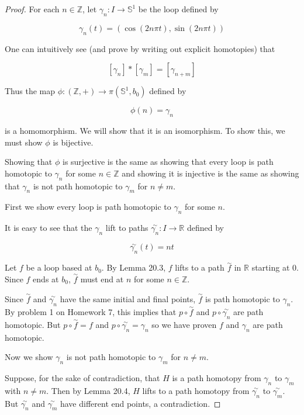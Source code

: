 \documentclass[a4paper]{article}
\numberwithin{theorem}{section}
\begin{document}
\begin{proof}
For each $n \in \mathbb{Z}$, let $\gamma_n: I \rightarrow \mathbb{S}^1$ be the loop defined by

$$ \gamma_n(t) = (\cos(2 n \pi t), \sin ( 2 n \pi t)) $$

One can intuitively see (and prove by writing out explicit homotopies) that

$$ [\gamma_n] \ast [\gamma_m] = [\gamma_{n + m}] $$

Thus the map $\phi: (\mathbb{Z},+) \rightarrow \pi(\mathbb{S}^1,b_0)$ defined by 

$$ \phi(n) = \gamma_n $$

is a homomorphism. We will show that it is an isomorphism. To show this, we must show $\phi$ is bijective.

Showing that $\phi$ is surjective is the same as showing that every loop is path homotopic to $\gamma_n$ for some $n \in \mathbb{Z}$ and showing it is injective is the same as showing that $\gamma_n$ is not path homotopic to $\gamma_m$ for $n \neq m$.

First we show every loop is path homotopic to $\gamma_n$ for some $n$.

It is easy to see that the $\gamma_n$ lift to paths $\overset{\sim}{\gamma_n}: I \rightarrow \mathbb{R}$ defined by

$$ \overset{\sim}{\gamma_n}(t) = nt $$

Let $f$ be a loop based at $b_0$. By Lemma 20.3, $f$ lifts to a path $\overset{\sim}{f}$ in $\mathbb{R}$ starting at $0$. Since $f$ ends at $b_0$, $\overset{\sim}{f}$ must end at $n$ for some $n \in \mathbb{Z}$.

Since $\overset{\sim}{f}$ and $\overset{\sim}{\gamma_n}$ have the same initial and final points, $\overset{\sim}{f}$ is path homotopic to $\gamma_n$. By problem 1 on Homework 7, this implies that $p \circ \overset{\sim}{f}$ and $p \circ \overset{\sim}{\gamma_n}$ are path homotopic. But $p \circ \overset{\sim}{f} = f$ and $p \circ \overset{\sim}{\gamma_n} = \gamma_n$ so we have proven $f$ and $\gamma_n$ are path homotopic.

Now we show $\gamma_n$ is not path homotopic to $\gamma_m$ for $n \neq m$.

Suppose, for the sake of contradiction, that $H$ is a path homotopy from $\gamma_n$ to $\gamma_m$ with $n \neq m$. Then by Lemma 20.4, $H$ lifts to a path homotopy from $\overset{\sim}{\gamma_n}$ to $\overset{\sim}{\gamma_m}$. But $\overset{\sim}{\gamma_n}$ and $\overset{\sim}{\gamma_m}$ have different end points, a contradiction.
\end{proof}
\end{document}
